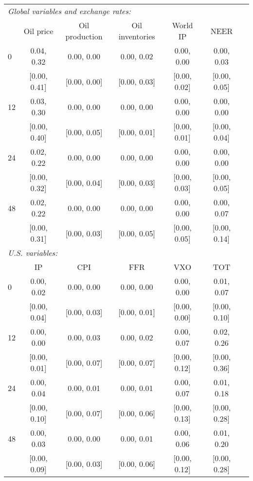 \begin{tabular}{lcccccc}\toprule\midrule  
\multicolumn{6}{l}{\textit{Global variables and exchange rates:}} \\ 
 & Oil price & Oil production & Oil inventories & World IP & NEER  \\ \midrule  
 0 & 0.04,    0.32 & 0.00,    0.00 & 0.00,    0.02 & 0.00,    0.00 & 0.00,    0.03 \\  
 & [0.00,    0.41] & [0.00,    0.00] & [0.00,    0.03] & [0.00,    0.02] & [0.00,    0.05] \\  
 12 & 0.03,    0.30 & 0.00,    0.00 & 0.00,    0.00 & 0.00,    0.00 & 0.00,    0.00 \\  
 & [0.00,    0.40] & [0.00,    0.05] & [0.00,    0.01] & [0.00,    0.01] & [0.00,    0.04] \\  
 24 & 0.02,    0.22 & 0.00,    0.00 & 0.00,    0.00 & 0.00,    0.00 & 0.00,    0.00 \\  
 & [0.00,    0.32] & [0.00,    0.04] & [0.00,    0.03] & [0.00,    0.03] & [0.00,    0.05] \\  
 48 & 0.02,    0.22 & 0.00,    0.00 & 0.00,    0.00 & 0.00,    0.00 & 0.00,    0.07 \\  
 & [0.00,    0.31] & [0.00,    0.03] & [0.00,    0.05] & [0.00,    0.05] & [0.00,    0.14] \\[2ex] \midrule  
\multicolumn{6}{l}{\textit{U.S. variables:}} \\ 
 & IP & CPI & FFR & VXO & TOT  \\ \midrule  
 0 & 0.00,    0.02 & 0.00,    0.00 & 0.00,    0.00 & 0.00,    0.00 & 0.01,    0.07 \\  
 & [0.00,    0.04] & [0.00,    0.03] & [0.00,    0.01] & [0.00,    0.00] & [0.00,    0.10] \\  
 12 & 0.00,    0.00 & 0.00,    0.03 & 0.00,    0.02 & 0.00,    0.07 & 0.02,    0.26 \\  
 & [0.00,    0.01] & [0.00,    0.07] & [0.00,    0.07] & [0.00,    0.12] & [0.00,    0.36] \\  
 24 & 0.00,    0.04 & 0.00,    0.01 & 0.00,    0.01 & 0.00,    0.07 & 0.01,    0.18 \\  
 & [0.00,    0.10] & [0.00,    0.07] & [0.00,    0.06] & [0.00,    0.13] & [0.00,    0.28] \\  
 48 & 0.00,    0.03 & 0.00,    0.00 & 0.00,    0.01 & 0.00,    0.06 & 0.01,    0.20 \\  
 & [0.00,    0.09] & [0.00,    0.03] & [0.00,    0.06] & [0.00,    0.12] & [0.00,    0.28] \\  
\midrule\bottomrule 
\end{tabular}
